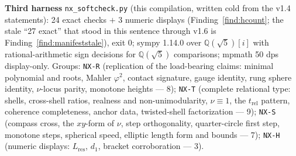 \documentclass[11pt]{article}
\newcommand{\hx}[1]{\textcolor{cC}{\footnotesize\texttt{#1}}}
\newcommand{\Q}{\mathbb{Q}}
\newcommand{\gp}{\varphi}
\theoremstyle{plain}
\theoremstyle{definition}
\theoremstyle{remark}
\begin{document}
\smallskip\noindent
\textbf{Third harness} \texttt{nx\_softcheck.py} (this compilation,
written cold from the v1.4 statements): 24 exact checks $+$ 3 numeric
displays (Finding~\ref{find:hcount}; the stale ``27 exact'' that stood in
this sentence through v1.6 is Finding~\ref{find:manifeststale}), exit 0;
sympy
1.14.0 over $\Q(\sqrt5)[i]$ with rational-arithmetic sign decisions for
$\Q(\sqrt5)$ comparisons; mpmath 50 dps display-only. Groups: \hx{NX-R}
(replication of the load-bearing claims: minimal polynomial and roots,
Mahler $\gp^2$, contact signature, gauge identity, rung sphere identity,
$\nu$-locus parity, monotone heights --- 8); \hx{NX-T} (complete
relational type: shells, cross-shell ratios, realness and
non-unimodularity, $\nu\equiv1$, the $t_{\mathrm{rel}}$ pattern,
coherence completeness, anchor data, twisted-shell factorization --- 9);
\hx{NX-S} (compass cross, the $xy$-form of $\nu$, step orthogonality,
quarter-circle first step, monotone steps, spherical speed, elliptic length
form and bounds --- 7); \hx{NX-H} (numeric displays: $L_{\mathrm{res}}$,
$d_1$, bracket corroboration --- 3).
\end{document}
